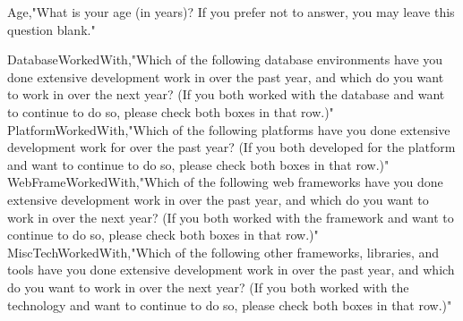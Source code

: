 \begin{appendices}
    Age,"What is your age (in years)? If you prefer not to answer, you may leave this question blank."


    DatabaseWorkedWith,"Which of the following database environments have you done extensive development work in over the past year, and which do you want to work in over the next year?   (If you both worked with the database and want to continue to do so, please check both boxes in that row.)"
    PlatformWorkedWith,"Which of the following platforms have you done extensive development work for over the past year?   (If you both developed for the platform and want to continue to do so, please check both boxes in that row.)"
    WebFrameWorkedWith,"Which of the following web frameworks have you done extensive development work in over the past year, and which do you want to work in over the next year? (If you both worked with the framework and want to continue to do so, please check both boxes in that row.)"
    MiscTechWorkedWith,"Which of the following other frameworks, libraries, and tools have you done extensive development work in over the past year, and which do you want to work in over the next year? (If you both worked with the technology and want to continue to do so, please check both boxes in that row.)"



\end{appendices}
